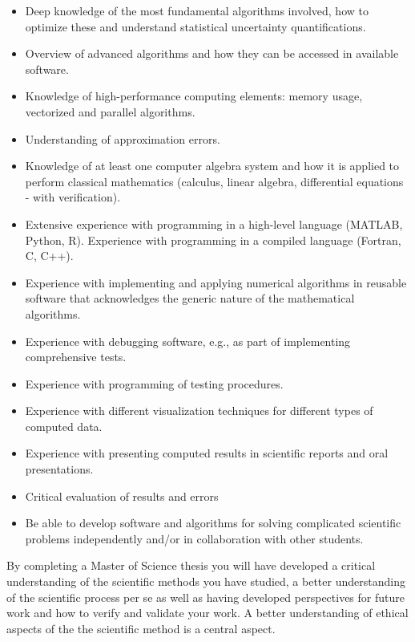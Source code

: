 \documentclass[%
oneside,                 %
final,                   %
10pt]{article}
\begin{document}
\begin{itemize}
\item Deep knowledge of the most fundamental algorithms involved, how to optimize these  and understand statistical uncertainty quantifications.

\item Overview of advanced algorithms and how they can be accessed in available software.

\item Knowledge of high-performance computing elements: memory usage, vectorized and parallel algorithms.

\item Understanding of approximation errors.

\item Knowledge of at least one computer algebra system and how it is applied to perform classical mathematics (calculus, linear algebra, differential equations - with verification).

\item Extensive experience with programming in a high-level language (MATLAB, Python, R). Experience with programming in a compiled language (Fortran, C, C++).

\item Experience with implementing and applying numerical algorithms in reusable software that acknowledges the generic nature of the mathematical algorithms.

\item Experience with debugging software, e.g., as part of implementing comprehensive tests.

\item Experience with programming of testing procedures.

\item Experience with different visualization techniques for different types of computed data.

\item Experience with presenting computed results in scientific reports and oral presentations.

\item Critical evaluation of results and errors

\item Be able to develop software and algorithms for solving complicated scientific problems independently and/or in collaboration with other students.
\end{itemize}

\noindent
By completing a Master of Science thesis you will have developed a critical understanding of the scientific methods you have studied, a better understanding of the scientific process per se as well as having developed perspectives for future work and how to verify and validate your work. A better understanding of ethical aspects of the the scientific method is a central aspect.
\end{document}
